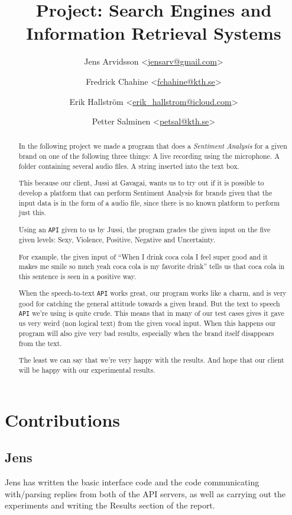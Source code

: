 \documentclass[a4paper,12pt,twoside]{ltxdoc}
\title{Project: Search Engines and Information Retrieval Systems}
\author{
Jens Arvidsson <\href{mailto:jensarv@gmail.com}{jensarv@gmail.com}> \and
Fredrick Chahine <\href{mailto:fchahine@kth.se}{fchahine@kth.se}> \and
Erik Hallström  <\href{mailto:erik_hallstrom@icloud.com}{erik\_hallstrom@icloud.com}> \and
Petter Salminen <\href{mailto:petsal@kth.se}{petsal@kth.se}>}
\begin{document}
\maketitle
\tableofcontents

\newpage
\begin{abstract}
In the following project we made a program that does a \emph{Sentiment Analysis} for a given brand on one of the following three things: A live recording using the microphone. A folder containing several audio files. A string inserted into the text box.

This because our client, Jussi at Gavagai, wants us to try out if it is possible to develop a platform that can perform Sentiment Analysis for brands given that the input data is in the form of a audio file, since there is no known platform to perform just this. 

Using an \verb#API# given to us by Jussi, the program grades the given input on the five given levels: Sexy, Violence, Positive, Negative and Uncertainty. 

For example, the given input of ``When I drink coca cola I feel super good and it makes me smile so much yeah coca cola is my favorite drink'' tells us that coca cola in this sentence is seen in a positive way. 

When the speech-to-text \verb#API# works great, our program works like a charm, and is very good for catching the general attitude towards a given brand. But the text to speech \verb#API# we're using is quite crude. This means that in many of our test cases gives it gave us very weird (non logical text) from the given vocal input. When this happens our program will also give very bad results, especially when the brand itself disappears from the text.

The least we can say that we're very happy with the results. And hope that our client will be happy with our experimental results.
\end{abstract}

\section{Contributions}
\subsection{Jens}
Jens has written the basic interface code and the code communicating with/parsing replies from both of the API servers, as well as carrying out the experiments and writing the Results section of the report.
\end{document}
